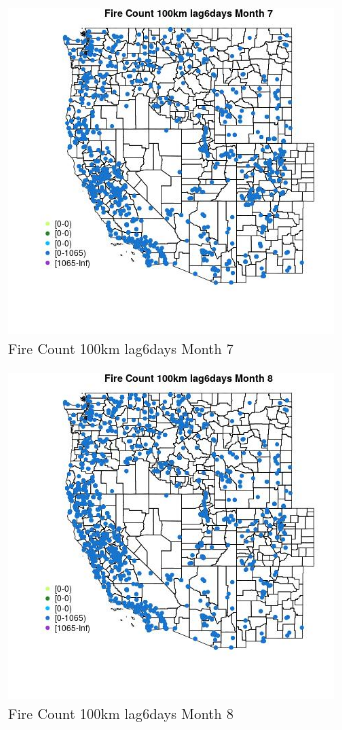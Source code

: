 \begin{figure} 
\centering  
\includegraphics[width=0.77\textwidth]{Code_Outputs/Report_ML_input_PM25_Step4_part_f_de_duplicated_aveswNAs_MapObsMo7Fire_Count_100km_lag6days.jpg} 
\caption{\label{fig:Report_ML_input_PM25_Step4_part_f_de_duplicated_aveswNAsMapObsMo7Fire_Count_100km_lag6days}Fire Count 100km lag6days Month 7} 
\end{figure} 
 

\begin{figure} 
\centering  
\includegraphics[width=0.77\textwidth]{Code_Outputs/Report_ML_input_PM25_Step4_part_f_de_duplicated_aveswNAs_MapObsMo8Fire_Count_100km_lag6days.jpg} 
\caption{\label{fig:Report_ML_input_PM25_Step4_part_f_de_duplicated_aveswNAsMapObsMo8Fire_Count_100km_lag6days}Fire Count 100km lag6days Month 8} 
\end{figure} 
 

